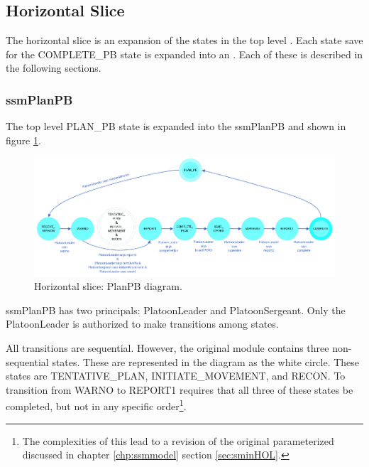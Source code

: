 \documentclass[../../main/main.tex]{subfiles}
\begin{document}
 \clearpage

\subsection{Horizontal Slice}\label{ssec:horizontalslice}
The horizontal slice is an expansion of the states in the top level .  Each state save for the COMPLETE_PB state is expanded into an .  Each of these  is described in the following sections.

\subsubsection{ssmPlanPB}\label{sssec:ssmPlanPB}
The top level PLAN_PB state is expanded into the ssmPlanPB  and shown in figure \ref{ssmPlanPBDiagram}.

\begin{figure}[h!]
\centering
\includegraphics[width=\textwidth]{../figures/ssmPlanPBDiagram}
\caption{\label{ssmPlanPBDiagram} Horizontal slice: PlanPB diagram.}
\end{figure}


ssmPlanPB has two principals: PlatoonLeader and PlatoonSergeant.  Only the PlatoonLeader is authorized to make transitions among states.  

All transitions are sequential.  However, the original module contains three non-sequential states.  These are represented in the diagram as the white circle. These states are TENTATIVE_PLAN, INITIATE_MOVEMENT, and RECON.  To transition from WARNO to REPORT1 requires that all three of these states be completed, but not in any specific order\footnote{The complexities of this  lead to a revision of the original parameterized  discussed in chapter \ref{chp:ssmmodel} section \ref{sec:sminHOL}.}. 
\end{document}
